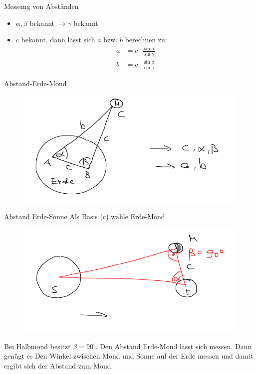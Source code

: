 \documentclass[a4paper,10pt]{scrartcl}
\begin{document}
\begin{enumerate}[a)]
\begin{seg}{Messung von Abständen}
 \begin{itemize}
  \item $\alpha, \beta$ bekannt $\to \gamma$ bekannt
  \item $c$ bekannt, dann lässt sich $a$ bzw. $b$ berechnen zu:
\begin{align*}
a&=c\cdot \frac{\sin \alpha}{\sin \gamma}\\
b&=c\cdot \frac{\sin \beta}{\sin \gamma}
\end{align*}
 \end{itemize}
\end{seg}
 \begin{seg}{Abstand-Erde-Mond}
 \begin{figure}[h]
  \includegraphics[scale=0.5]{fig8.png}
 \end{figure}
\end{seg}
 \begin{seg}{Abstand Erde-Sonne}
 Als Basis (c) wähle Erde-Mond
 \begin{figure}[h]
  \includegraphics[scale=0.5]{fig9.png}
 \end{figure}
 Bei Halbmond besitzt $\beta=90^\circ$.  Den Abstand Erde-Mond lässt sich messen. Dann genügt es Den Winkel zwischen Mond und Sonne auf der Erde messen und damit ergibt sich der Abstand zum Mond.

\end{seg}
\end{enumerate}
\end{document}
